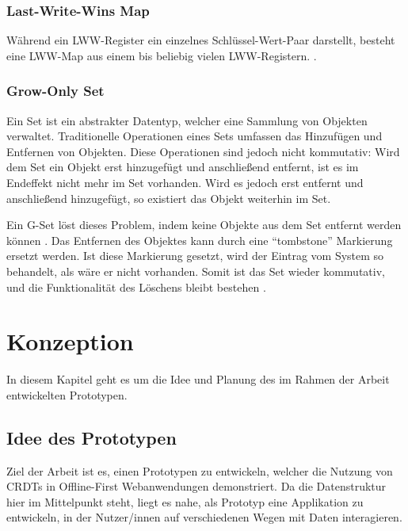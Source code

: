 \documentclass[a4paper, 12pt]{scrreprt}
\begin{document}
\subsection{Last-Write-Wins Map}
\label{sec:lwwMap}
\sloppypar
Während ein \ac{LWW-Register} ein einzelnes Schlüssel-Wert-Paar darstellt, besteht eine LWW-Map aus einem bis beliebig vielen LWW-Registern. \autocite[43]{PhdthesisLwwMap}.


\subsection{Grow-Only Set}
\label{sec:g-set}
Ein Set ist ein abstrakter Datentyp, welcher eine Sammlung von Objekten verwaltet. Traditionelle Operationen eines Sets umfassen das Hinzufügen und Entfernen von Objekten. Diese Operationen sind jedoch nicht kommutativ: Wird dem Set ein Objekt erst hinzugefügt und anschließend entfernt, ist es im Endeffekt nicht mehr im Set vorhanden. Wird es jedoch erst entfernt und anschließend hinzugefügt, so existiert das Objekt weiterhin im Set.

Ein \ac{G-Set} löst dieses Problem, indem keine Objekte aus dem Set entfernt werden können  \autocite[S.17]{ArticlePureOP}. Das Entfernen des Objektes kann durch eine \enquote{tombstone} Markierung ersetzt werden. Ist diese Markierung gesetzt, wird der Eintrag vom System so behandelt, als wäre er nicht vorhanden. Somit ist das Set wieder kommutativ, und die Funktionalität des Löschens bleibt bestehen \autocite[S.7]{InproceedingsTombstone}.


\chapter{Konzeption}
In diesem Kapitel geht es um die Idee und Planung des im Rahmen der Arbeit entwickelten Prototypen. 

\section{Idee des Prototypen}
Ziel der Arbeit ist es, einen Prototypen zu entwickeln, welcher die Nutzung von \acp{CRDT} in Offline-First Webanwendungen demonstriert. Da die Datenstruktur hier im Mittelpunkt steht, liegt es nahe, als Prototyp eine Applikation zu entwickeln, in der Nutzer/innen auf verschiedenen Wegen mit Daten interagieren.
\end{document}
